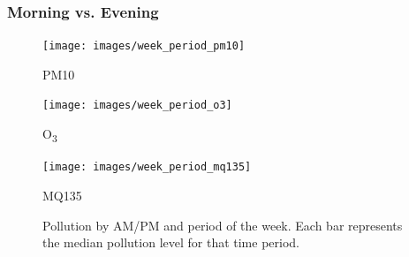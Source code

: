 \documentclass[11pt]{report}
\begin{document}

\subsubsection{Morning vs. Evening}

\begin{figure}[!htbp]
    \centering
      \texttt{[image: images/week\_period\_pm10]}
      \caption{PM10}
      \label{fig:week_period_pm10}
    \endminipage\hfill
      \texttt{[image: images/week\_period\_o3]}
      \caption{O\textsubscript{3}}
      \label{fig:week_period_o3}
    \endminipage\hfill
      \texttt{[image: images/week\_period\_mq135]}
      \caption{MQ135}
      \label{fig:week_period_mq135}
    \endminipage
    \caption[Pollution by AM/PM and period of the week.]{Pollution by AM/PM and period of the week. Each bar represents the median pollution level for that time period.}
    \label{fig:week_period_bars}
\end{figure}
\end{document}
